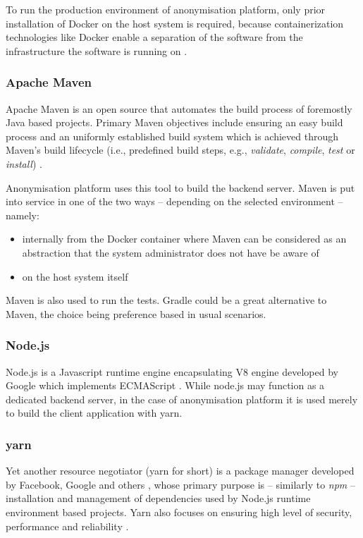 \documentclass[a4paper,twoside,12pt]{book}
\begin{document}
To run the production environment of anonymisation platform, only prior installation of Docker on the host system is required, because containerization technologies like Docker enable a separation of the software from the infrastructure the software is running on \cite{bib:docker_docs}\cite{bib:docker_book}.

\subsubsection{Apache Maven}

Apache Maven is an open source that automates the build process of foremostly Java based projects. Primary Maven objectives include ensuring an easy build process and an uniformly established build system which is achieved through Maven's build lifecycle (i.e., predefined build steps, e.g., \textit{validate}, \textit{compile}, \textit{test} or \textit{install}) \cite{bib:maven_docs}.

Anonymisation platform uses this tool to build the backend server. Maven is put into service in one of the two ways – depending on the selected environment – namely:
\begin{itemize}
\item internally from the Docker container where Maven can be considered as an abstraction that the system administrator does not have be aware of
\item on the host system itself
\end{itemize}

Maven is also used to run the tests. Gradle could be a great alternative to Maven, the choice being preference based in usual scenarios.

\subsubsection{Node.js}

Node.js is a Javascript runtime engine encapsulating V8 engine developed by Google which implements ECMAScript \cite{bib:v8_docs}. While node.js may function as a dedicated backend server, in the case of anonymisation platform it is used merely to build the client application with yarn.

\subsubsection{yarn}

Yet another resource negotiator (yarn for short) is a package manager developed by Facebook, Google and others \cite{bib:yarn_fb}, whose primary purpose is – similarly to \textit{npm} – installation and management of dependencies used by Node.js runtime environment based projects. Yarn also focuses on ensuring high level of security, performance and reliability \cite{bib:yarn_docs}.
\end{document}
